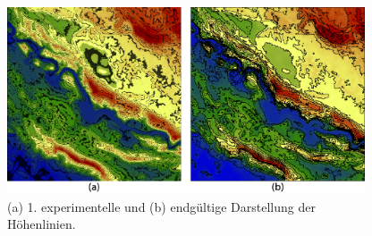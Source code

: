 \begin{Spacing}{\mylinespace}
\begin{figure}[h!]
	\centering
	\vspace*{50px}
	\includegraphics[width=400px]{graphics/contourLines2.png}
	\caption{(a) 1. experimentelle und (b) endgültige Darstellung der Höhenlinien.}
	\label{fig:contourLines}
\end{figure}


\end{Spacing}
\newpage
\clearpage
